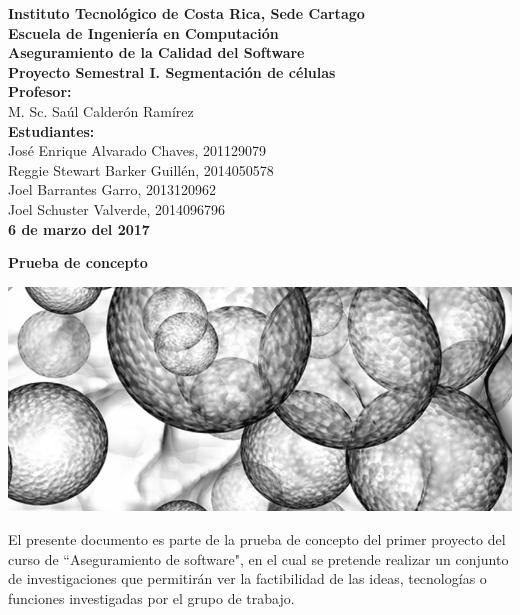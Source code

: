 \documentclass{report}
\begin{document}
\begin{flushleft}
\large
\textbf{Instituto Tecnol\'ogico de Costa Rica, Sede Cartago}\\
\textbf{Escuela de Ingenier\'ia en Computaci\'on}\\
\textbf{Aseguramiento de la Calidad del Software}\\
\textbf{Proyecto Semestral I. Segmentaci\'on de c\'elulas} \\
\textbf{Profesor:} \\
M. Sc. Sa\'ul Calder\'on Ram\'irez \\
\textbf{Estudiantes:} \\                                                                                             
Jos\'e Enrique Alvarado Chaves, 201129079\\
Reggie Stewart Barker Guill\'en, 2014050578 \\
Joel Barrantes Garro, 2013120962 \\
Joel Schuster Valverde, 2014096796 \\
\textbf{6 de marzo del 2017} \\

\end{flushleft}

\begin{center}
\huge  \textbf{Prueba de concepto}
\end{center}
\large
\begin{center}
\includegraphics [scale = 0.70]{celulas.png}\\ [0.5 cm] 
\end{center}
El presente documento es parte de la prueba de concepto del primer proyecto del curso de ``Aseguramiento de software", en el cual se pretende realizar un conjunto de investigaciones que permitir\'an ver la factibilidad de las ideas, tecnolog\'ias o funciones investigadas por el grupo de trabajo. \\ 
\end{document}
